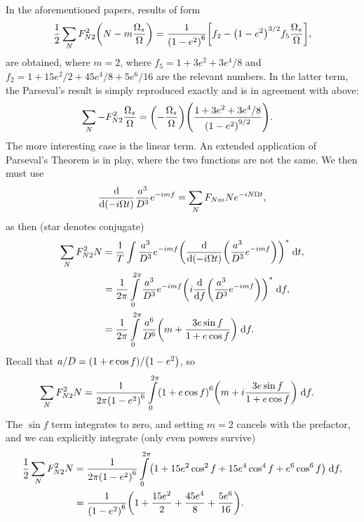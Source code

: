 \documentclass[11pt,
        usenames, %
        dvipsnames %
    ]{article}
\newcommand*{\rd}[2]{\frac{\mathrm{d}#1}{\mathrm{d}#2}}
\DeclarePairedDelimiter\p{\lparen}{\rparen}
\DeclarePairedDelimiter\s{\lbrack}{\rbrack}
\begin{document}
In the aforementioned papers, results of form
\begin{equation}
    \frac{1}{2}\sum\limits_{N}F_{N2}^2 \p*{N - m\frac{\Omega_s}{\Omega}}
        = \frac{1}{\p*{1 - e^2}^6}\s*{f_2 - \p*{1 - e^2}^{3/2}
            f_5\frac{\Omega_s}{\Omega}},
\end{equation}
are obtained, where $m = 2$, where $f_5 = 1 + 3e^2 + 3e^4/8$ and $f_2 = 1 +
15e^2/2 + 45e^4/8 + 5e^6/16$ are the relevant numbers. In the latter term, the
Parseval's result is simply reproduced exactly and is in agreement with above:
\begin{align}
    \sum\limits_N -F_{N2}^2\frac{\Omega_s}{\Omega}
        &= \p*{-\frac{\Omega_s}{\Omega}}\p*{\frac{1 + 3e^2 + 3e^4/8}{
            \p*{1 - e^2}^{9/2}}}.
\end{align}
The more interesting case is the linear term. An extended application of
Parseval's Theorem is in play, where the two functions are not the same. We then
must use
\begin{equation}
    \rd{}{\p*{-i \Omega t}}\frac{a^3}{D^3}e^{-imf}
        = \sum\limits_N F_{Nm} Ne^{-iN\Omega t},
\end{equation}
as then (star denotes conjugate)
\begin{align}
    \sum\limits_N F_{N2}^2 N &= \frac{1}{T}\int\limits
        \frac{a^3}{D^3}e^{-imf}
            \p*{\rd{}{\p*{-i \Omega t}}\p*{\frac{a^3}{D^3}
                e^{-imf}}}^*\;\mathrm{d}t,\\
        &= \frac{1}{2\pi} \int\limits_0^{2\pi}
            \frac{a^3}{D^3}e^{-imf}
            \p*{i\rd{}{f}\p*{\frac{a^3}{D^3}
                e^{-imf}}}^*\;\mathrm{d}f,\\
        &= \frac{1}{2\pi} \int\limits_0^{2\pi}
            \frac{a^6}{D^6}\p*{m + \frac{3e\sin f}{1 + e\cos f}}
                \;\mathrm{d}f.
\end{align}
Recall that $a/D = \p*{1 + e\cos f} / \p*{1 - e^2}$, so
\begin{align}
    \sum\limits_N F_{N2}^2 N
        &= \frac{1}{2\pi\p*{1 - e^2}^6} \int\limits_0^{2\pi}
            \p*{1 + e\cos f}^6\p*{m + i\frac{3e\sin f}{1 + e\cos f}}
                \;\mathrm{d}f.
\end{align}
The $\sin f$ term integrates to zero, and setting $m = 2$ cancels with the
prefactor, and we can explicitly integrate (only even powers survive)
\begin{align}
    \frac{1}{2}\sum\limits_N F_{N2}^2N
        &= \frac{1}{2\pi\p*{1 - e^2}^6}\int\limits_0^{2\pi}
            \p*{1 + 15e^2\cos^2f + 15e^4\cos^4f
                + e^6\cos^6 f}\;\mathrm{d}f,\\
        &= \frac{1}{\p*{1 - e^2}^6}\p*{1 + \frac{15e^2}{2}
            + \frac{45 e^4}{8} + \frac{5e^6}{16}}.
\end{align}
\end{document}
